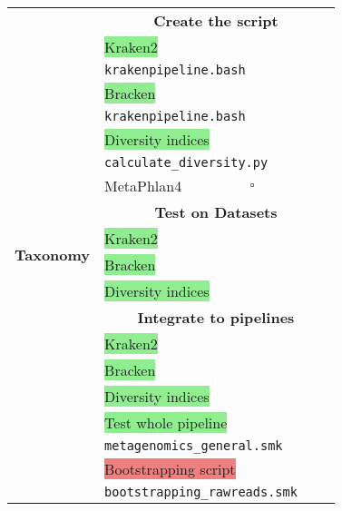 \documentclass[11pt]{report}
\newcommand{\done}{\checkmark}
\newcommand{\pending}{$\square$}
\newcommand{\highlightessential}[1]{\colorbox{lightgreen}{#1}}
\newcommand{\highlightoptional}[1]{\colorbox{lightorange}{#1}}
\newcommand{\highlightrobust}[1]{\colorbox{lightcoral}{#1}}
\begin{document}
\begin{longtable}{|c|p{8cm}|c|c|c|c|c|c|}
	\multirow{20}{*}{\textbf{Taxonomy}} 
	& \multicolumn{7}{c|}{\textbf{Create the script}} \\
	& \highlightessential{Kraken2} & & & & & & \done \\
	& \multicolumn{7}{l}{\texttt{krakenpipeline.bash}} \\ 
	& \highlightessential{Bracken} & & & & & & \done \\
	& \multicolumn{7}{l}{\texttt{krakenpipeline.bash}} \\ 
	& \highlightessential{Diversity indices} & & & & & & \done \\
	& \multicolumn{7}{l}{\texttt{calculate\_diversity.py}} \\ 
	& \highlightoptional{MetaPhlan4} & \pending & & & & & \\ 
	& \multicolumn{7}{c|}{\textbf{Test on Datasets}} \\
	& \highlightessential{Kraken2} & & & & & & \done \\
	& \highlightessential{Bracken} & & & & & & \done \\
	& \highlightessential{Diversity indices} & & & & & & \done \\
	& \multicolumn{7}{c|}{\textbf{Integrate to pipelines}} \\
	& \highlightessential{Kraken2} & & & & & & \done \\
	& \highlightessential{Bracken} & & & & & & \done \\
	& \highlightessential{Diversity indices} & & & & & & \done \\
	& \highlightessential{Test whole pipeline} & & & & & & \done \\
	& \multicolumn{7}{l}{\texttt{metagenomics\_general.smk}} \\ 
	& \highlightrobust{Bootstrapping script} & & & & & & \done \\
	& \multicolumn{7}{l}{\texttt{bootstrapping\_rawreads.smk}} \\ \hline
	

\end{longtable}
\end{document}
